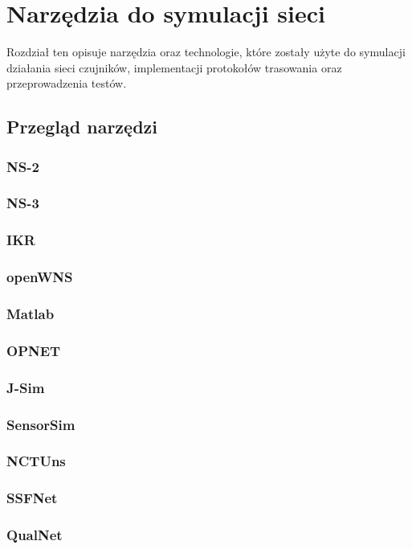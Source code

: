 \chapter{Narzędzia do symulacji sieci}
Rozdział ten opisuje narzędzia oraz technologie, które zostały użyte do symulacji działania sieci czujników, implementacji protokołów trasowania oraz przeprowadzenia testów.
\section{Przegląd narzędzi}
\cite{Xian2008}
\cite{Nayyar2015}
\subsection{NS-2}
\subsection{NS-3}
\subsection{IKR}
\subsection{openWNS}
\subsection{Matlab}
\subsection{OPNET}
\subsection{J-Sim}
\subsection{SensorSim}
\subsection{NCTUns}
\subsection{SSFNet}
\subsection{QualNet}
